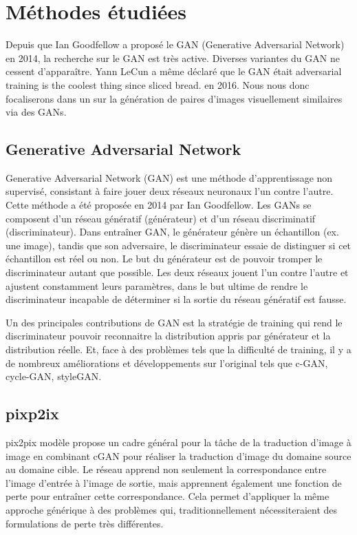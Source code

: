 \chapter{Méthodes étudiées}
Depuis que Ian Goodfellow a proposé le GAN (Generative Adversarial Network) en 2014, la recherche sur le GAN est très active. Diverses variantes du GAN ne cessent d'apparaître. Yann LeCun a même déclaré que le GAN était \og{}adversarial training is the coolest thing since sliced bread.\fg{} en 2016. Nous nous donc focaliserons dans un sur la génération de paires d’images visuellement similaires via des GANs. 

\section{Generative Adversarial Network}

Generative Adversarial Network (GAN) est une méthode d'apprentissage non supervisé, consistant à faire jouer deux réseaux neuronaux l'un contre l'autre. Cette méthode a été proposée en 2014 par Ian Goodfellow\cite{goodfellow2014generative}. Les GANs se composent d'un réseau génératif (générateur) et d'un réseau discriminatif (discriminateur). Dans entraîner GAN, le générateur génère un échantillon (ex. une image), tandis que son adversaire, le discriminateur essaie de distinguer si cet échantillon est réel ou non. Le but du générateur est de pouvoir tromper le discriminateur autant que possible. Les deux réseaux jouent l'un contre l'autre et ajustent constamment leurs paramètres, dans le but ultime de rendre le discriminateur incapable de déterminer si la sortie du réseau génératif est fausse. 

Un des principales contributions de GAN est la stratégie de training qui rend le discriminateur pouvoir reconnaitre la distribution appris par générateur et la distribution réelle. Et, face à des problèmes tels que la difficulté de training, il y a de nombreux améliorations et développements sur l'original tels que c-GAN, cycle-GAN, styleGAN.

\section{pixp2ix} 
pix2pix modèle propose un cadre général pour la tâche de la traduction d'image à image en combinant cGAN pour réaliser la traduction d'image du domaine source au domaine cible. Le réseau apprend non seulement la correspondance entre l'image d'entrée à l'image de sortie, mais apprennent également une fonction de perte pour entraîner cette correspondance. Cela permet d'appliquer la même approche générique à des problèmes qui, traditionnellement nécessiteraient des formulations de perte très différentes\cite{isola2017image}. 

